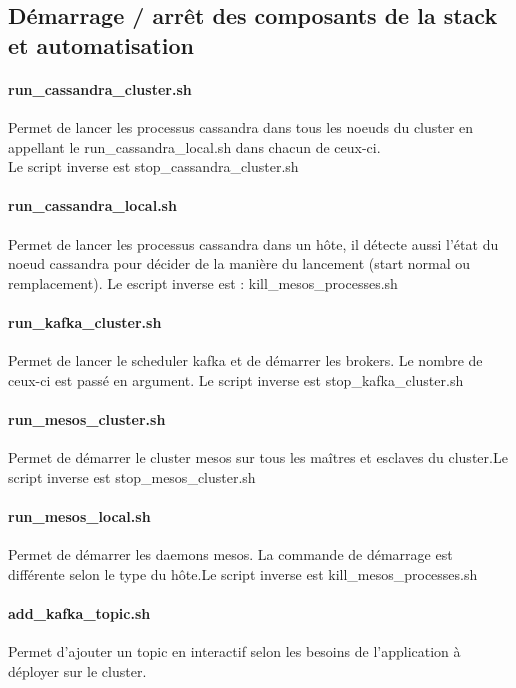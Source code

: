\documentclass[a4paper, 11pt, titlepage]{article}
\begin{document}
\subsection{Démarrage / arrêt des composants de la stack et automatisation}
\paragraph{run\_cassandra\_cluster.sh}
Permet de lancer les processus cassandra dans tous les noeuds du cluster en appellant le run\_cassandra\_local.sh dans chacun de ceux-ci. \\Le script inverse est stop\_cassandra\_cluster.sh

\paragraph{run\_cassandra\_local.sh}
Permet de lancer les processus cassandra dans un hôte, il détecte aussi l’état du noeud cassandra pour décider de la manière du lancement (start normal ou remplacement). Le escript inverse est : kill\_mesos\_processes.sh

\paragraph{run\_kafka\_cluster.sh}
Permet de lancer le scheduler kafka et de démarrer les brokers. Le nombre de ceux-ci est passé en argument. Le script inverse est stop\_kafka\_cluster.sh

\paragraph{run\_mesos\_cluster.sh}
Permet de démarrer le cluster mesos sur tous les maîtres et esclaves du cluster.Le script inverse est stop\_mesos\_cluster.sh

\paragraph{run\_mesos\_local.sh}
Permet de démarrer les daemons mesos. La commande de démarrage est différente selon le type du hôte.Le script inverse est kill\_mesos\_processes.sh

\paragraph{add\_kafka\_topic.sh}
Permet d’ajouter un topic en interactif  selon les besoins de l’application à déployer sur le cluster.
\end{document}
